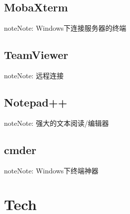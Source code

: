 \documentclass[letterpaper,10pt,english]{sphinxmanual}
\begin{document}
\section{MobaXterm}
\label{\detokenize{softwares/index:mobaxterm}}
\begin{sphinxadmonition}{note}{Note:}
Windows下连接服务器的终端

\end{sphinxadmonition}


\section{TeamViewer}
\label{\detokenize{softwares/index:teamviewer}}
\begin{sphinxadmonition}{note}{Note:}
远程连接

\end{sphinxadmonition}


\section{Notepad++}
\label{\detokenize{softwares/index:notepad}}
\begin{sphinxadmonition}{note}{Note:}
强大的文本阅读/编辑器

\end{sphinxadmonition}


\section{cmder}
\label{\detokenize{softwares/index:cmder}}
\begin{sphinxadmonition}{note}{Note:}
Windows下终端神器

\end{sphinxadmonition}


\chapter{Tech}
\label{\detokenize{tech/index:tech}}\label{\detokenize{tech/index::doc}}
\end{document}
